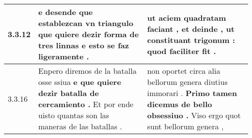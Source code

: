 \begin{tabular}{|p{1cm}|p{6.5cm}|p{6.5cm}|}
3.3.12 & e desende que establezcan vn triangulo \textbf{ que quiere dezir forma de tres linnas } e esto se faz ligeramente . & ut aciem quadratam faciant , \textbf{ et deinde , ut constituant trigonum : } quod faciliter fit . \\\hline
3.3.16 & Enpero diremos de la batalla osse ssiua \textbf{ e que quiere dezir batalla de cercamiento . } Et por ende uisto quantas son las maneras de las batallas . & non oportet circa alia bellorum genera diutius immorari . \textbf{ Primo tamen dicemus de bello obsessiuo . } Viso ergo quot sunt bellorum genera , \\\hline

\end{tabular}

